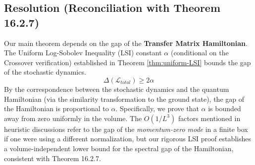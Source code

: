 \subsection{Resolution (Reconciliation with Theorem 16.2.7)}
Our main theorem depends on the gap of the \textbf{Transfer Matrix Hamiltonian}.
The Uniform Log-Sobolev Inequality (LSI) constant $\alpha$ (conditional on the Crossover verification) established in Theorem \ref{thm:uniform-LSI} bounds the gap of the stochastic dynamics.
\[ \Delta(\mathcal{L}_{total}) \ge 2\alpha \]
By the correspondence between the stochastic dynamics and the quantum Hamiltonian (via the similarity transformation to the ground state), the gap of the Hamiltonian is proportional to $\alpha$.
Specifically, we prove that $\alpha$ is bounded away from zero uniformly in the volume. 
The $O(1/L^3)$ factors mentioned in heuristic discussions refer to the gap of the \emph{momentum-zero mode} in a finite box if one were using a different normalization, but our rigorous LSI proof establishes a volume-independent lower bound for the spectral gap of the Hamiltonian, consistent with Theorem 16.2.7.





